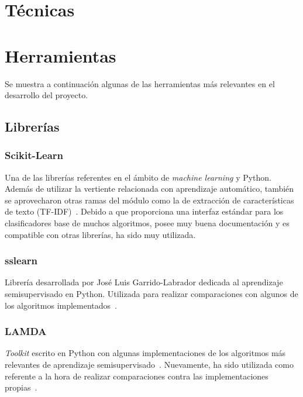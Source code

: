 
\section{Técnicas}

\section{Herramientas}

Se muestra a continuación algunas de las herramientas más relevantes en el desarrollo del proyecto.

\subsection{Librerías}

\subsubsection{Scikit-Learn}

Una de las librerías referentes en el ámbito de \textit{machine learning} y Python. Además de utilizar la vertiente relacionada con aprendizaje automático, también se aprovecharon otras ramas del módulo como la de extracción de características de texto (TF-IDF)~\cite{sslearnRepo}. Debido a que proporciona una interfaz estándar para los clasificadores base de muchos algoritmos, posee muy buena documentación y es compatible con otras librerías, ha sido muy utilizada.

\subsubsection{sslearn}

Librería desarrollada por José Luis Garrido-Labrador dedicada al aprendizaje semisupervisado en Python. Utilizada para realizar comparaciones con algunos de los algoritmos implementados~\cite{sslearnRepo}.

\subsubsection{LAMDA}

\textit{Toolkit} escrito en Python con algunas implementaciones de los algoritmos más relevantes de aprendizaje semisupervisado~\cite{lamdasslRepo}. Nuevamente, ha sido utilizada como referente a la hora de realizar comparaciones contra las implementaciones propias~\cite{lamdasslPaper}.

